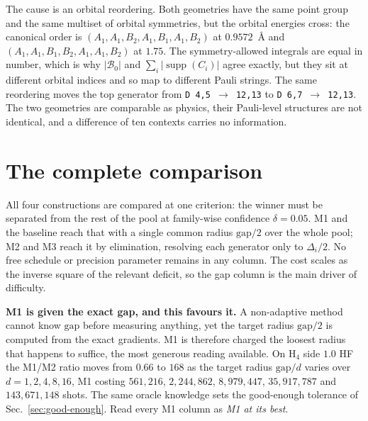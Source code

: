 \documentclass[10pt]{article}
\newcommand{\supp}{\operatorname{supp}}
\begin{document}
The cause is an orbital reordering. Both geometries have the same point group and
the same multiset of orbital symmetries, but the orbital energies cross: the
canonical order is $(A_1,A_1,B_2,A_1,B_1,A_1,B_2)$ at $0.9572$~\si{\angstrom} and
$(A_1,A_1,B_1,B_2,A_1,A_1,B_2)$ at $1.75$. The symmetry-allowed integrals are
equal in number, which is why $|\mathcal B_0|$ and $\sum_i|\supp(C_i)|$ agree
exactly, but they sit at different orbital indices and so map to different Pauli
strings. The same reordering moves the top generator from \texttt{D 4,5 $\to$
12,13} to \texttt{D 6,7 $\to$ 12,13}. The two geometries are comparable as
physics, their Pauli-level structures are not identical, and a difference of ten
contexts carries no information.

\section{The complete comparison}
\label{sec:completed}

All four constructions are compared at one criterion: the winner must be
separated from the rest of the pool at family-wise confidence $\delta=0.05$. M1
and the baseline reach that with a single common radius $\mathrm{gap}/2$ over the
whole pool; M2 and M3 reach it by elimination, resolving each generator only to
$\Delta_i/2$. No free schedule or precision parameter remains in any column. The
cost scales as the inverse square of the relevant deficit, so the gap column is
the main driver of difficulty.

\textbf{M1 is given the exact gap, and this favours it.} A non-adaptive method
cannot know $\mathrm{gap}$ before measuring anything, yet the target radius
$\mathrm{gap}/2$ is computed from the exact gradients. M1 is therefore charged
the loosest radius that happens to suffice, the most generous reading available.
On H$_4$ side $1.0$ HF the M1/M2 ratio moves from $0.66$ to $168$ as the target
radius $\mathrm{gap}/d$ varies over $d=1,2,4,8,16$, M1 costing $561{,}216$,
$2{,}244{,}862$, $8{,}979{,}447$, $35{,}917{,}787$ and $143{,}671{,}148$ shots. The same oracle knowledge
sets the good-enough tolerance of Sec.~\ref{sec:good-enough}. Read every M1 column
as \emph{M1 at its best}.
\end{document}
